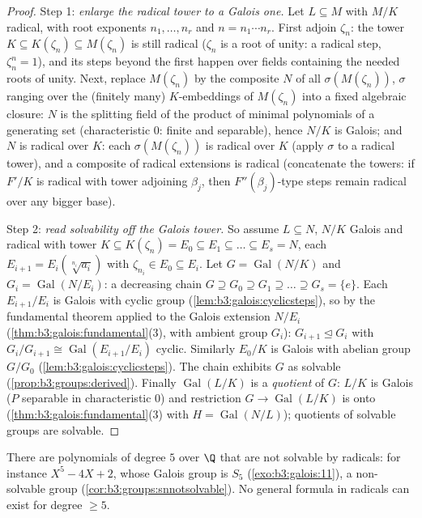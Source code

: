 \begin{proof}
Step 1: \emph{enlarge the radical tower to a Galois one.} Let $L
\subseteq M$ with $M/K$ radical, with root exponents $n_1, \dots,
n_r$ and $n = n_1\cdots n_r$. First adjoin $\zeta_n$: the tower
$K \subseteq K(\zeta_n) \subseteq M(\zeta_n)$ is still radical
($\zeta_n$ is a root of unity: a radical step, $\zeta_n^n = 1$),
and its steps beyond the first happen over fields containing the
needed roots of unity. Next, replace $M(\zeta_n)$ by the
composite $N$ of all $\sigma(M(\zeta_n))$, $\sigma$ ranging over
the (finitely many) $K$-embeddings of $M(\zeta_n)$ into a fixed
algebraic closure: $N$ is the splitting field of the product of
minimal polynomials of a generating set (characteristic $0$:
finite and separable), hence $N/K$ is Galois; and $N$ is
radical over $K$: each $\sigma(M(\zeta_n))$ is radical over $K$
(apply $\sigma$ to a radical tower), and a composite of radical
extensions is radical (concatenate the towers: if $F'/K$ is
radical with tower adjoining $\beta_j$, then $F''(\beta_j)$-type
steps remain radical over any bigger base).

Step 2: \emph{read solvability off the Galois tower.} So assume
$L \subseteq N$, $N/K$ Galois and radical with tower $K
\subseteq K(\zeta_n) = E_0 \subseteq E_1 \subseteq \dots
\subseteq E_s = N$, each $E_{i+1} = E_i(\sqrt[n_i]{a_i})$ with
$\zeta_{n_i} \in E_0 \subseteq E_i$. Let $G =
\operatorname{Gal}(N/K)$ and $G_i = \operatorname{Gal}(N/E_i)$:
a decreasing chain $G \supseteq G_0 \supseteq G_1 \supseteq
\dots \supseteq G_s = \{e\}$. Each $E_{i+1}/E_i$ is Galois with
cyclic group (\cref{lem:b3:galois:cyclicsteps}), so by the
fundamental theorem applied to the Galois extension $N/E_i$
(\cref{thm:b3:galois:fundamental}(3), with ambient group $G_i$):
$G_{i+1} \trianglelefteq G_i$ with $G_i/G_{i+1} \cong
\operatorname{Gal}(E_{i+1}/E_i)$ cyclic. Similarly $E_0/K$ is
Galois with abelian group $G/G_0$
(\cref{lem:b3:galois:cyclicsteps}). The chain exhibits $G$ as
solvable (\cref{prop:b3:groups:derived}). Finally
$\operatorname{Gal}(L/K)$ is a \emph{quotient} of $G$: $L/K$ is
Galois ($P$ separable in characteristic $0$) and restriction $G
\to \operatorname{Gal}(L/K)$ is onto
(\cref{thm:b3:galois:fundamental}(3) with $H =
\operatorname{Gal}(N/L)$); quotients of solvable groups are
solvable.
\end{proof}

\begin{corollary}
\label{cor:b3:galois:quintic}
There are polynomials of degree $5$ over $\Q$ that are not
solvable by radicals: for instance $X^5 - 4X + 2$, whose Galois
group is $S_5$ (\cref{exo:b3:galois:11}), a non-solvable group
(\cref{cor:b3:groups:snnotsolvable}). No general formula in
radicals can exist for degree $\geq 5$.
\end{corollary}

